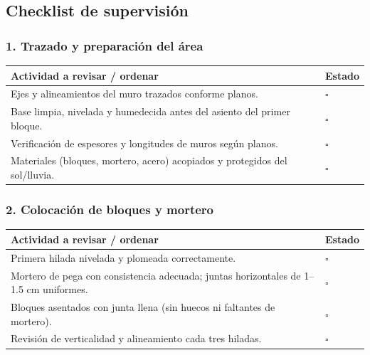 \documentclass[12pt]{article}
\newcommand{\cbox}{\(\square\)}
\renewcommand{\cbox}{\(\square\)} %
\begin{document}
	\subsection{Checklist de supervisión}
	
	\subsubsection*{1. Trazado y preparación del área}
	\begin{tabularx}{\linewidth}{>{\raggedright\arraybackslash}p{0.93\linewidth} >{\centering\arraybackslash}m{0.07\linewidth}}
		\toprule
		\textbf{Actividad a revisar / ordenar} & \textbf{Estado}\\
		\midrule
		Ejes y alineamientos del muro trazados conforme planos. & \cbox \\
		Base limpia, nivelada y humedecida antes del asiento del primer bloque. & \cbox \\
		Verificación de espesores y longitudes de muros según planos. & \cbox \\
		Materiales (bloques, mortero, acero) acopiados y protegidos del sol/lluvia. & \cbox \\
		\bottomrule
	\end{tabularx}
	
	\subsubsection*{2. Colocación de bloques y mortero}
	\begin{tabularx}{\linewidth}{>{\raggedright\arraybackslash}p{0.93\linewidth} >{\centering\arraybackslash}m{0.07\linewidth}}
		\toprule
		\textbf{Actividad a revisar / ordenar} & \textbf{Estado}\\
		\midrule
		Primera hilada nivelada y plomeada correctamente. & \cbox \\
		Mortero de pega con consistencia adecuada; juntas horizontales de 1–1.5 cm uniformes. & \cbox \\
		Bloques asentados con junta llena (sin huecos ni faltantes de mortero). & \cbox \\
		Revisión de verticalidad y alineamiento cada tres hiladas. & \cbox \\
		\bottomrule
	\end{tabularx}
	
\end{document}
